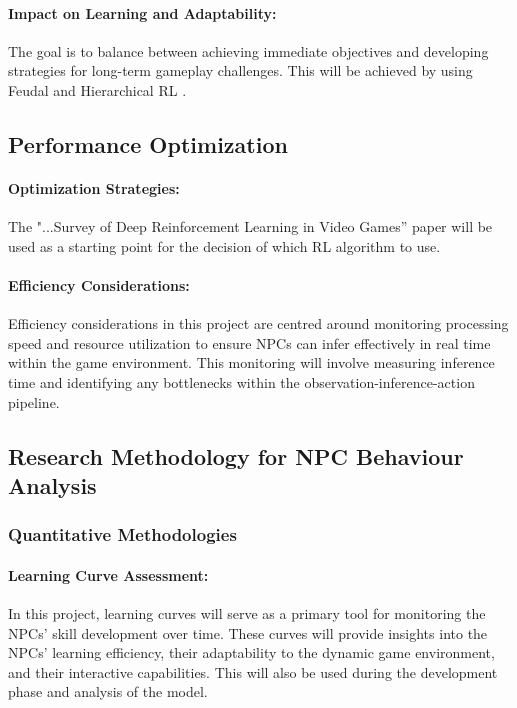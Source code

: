 \documentclass{article}
\begin{document}
\paragraph{Impact on Learning and Adaptability:}
The goal is to balance between achieving immediate objectives and developing strategies for long-term gameplay challenges. This will be achieved by using Feudal and Hierarchical RL \cite{Feudal_RL}.

\subsection{Performance Optimization}
\paragraph{Optimization Strategies:}
The "...Survey of Deep Reinforcement Learning in Video Games” paper will be used as a starting point for the decision of which RL algorithm to use.

\paragraph{Efficiency Considerations:}
Efficiency considerations in this project are centred around monitoring processing speed and resource utilization to ensure NPCs can infer effectively in real time within the game environment. This monitoring will involve measuring inference time and identifying any bottlenecks within the observation-inference-action pipeline. 

\subsection{Research Methodology for NPC Behaviour Analysis}
\subsubsection{Quantitative Methodologies}
\paragraph{Learning Curve Assessment:}
In this project, learning curves will serve as a primary tool for monitoring the NPCs' skill development over time. \cite{Crafter} These curves will provide insights into the NPCs' learning efficiency, their adaptability to the dynamic game environment, and their interactive capabilities. This will also be used during the development phase and analysis of the model.
\end{document}
